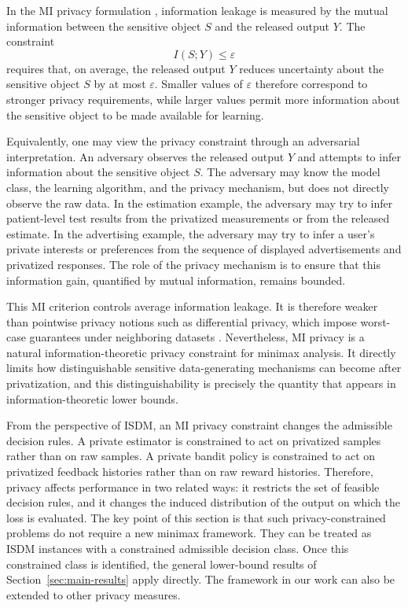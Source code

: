 \documentclass[journal]{IEEEtran}
\begin{document}
In the MI privacy formulation \cite{lopuhaa2020privacy,zamani2023privacy,zamani2022bounds,rassouli2021perfect,asoodeh2016information, basciftci2016privacy, shkel2020secrecy,du2017principal,zamani2024information,zamani2025variable,sankar2013utility, makhdoumi2014information}, information leakage is measured by the mutual
information between the sensitive object \(S\) and the released output \(Y\).
The constraint
\[
I(S;Y)\le \varepsilon
\]
requires that, on average, the released output \(Y\) reduces uncertainty about
the sensitive object \(S\) by at most \(\varepsilon\). Smaller values of
\(\varepsilon\) therefore correspond to stronger privacy requirements, while
larger values permit more information about the sensitive object to be made
available for learning.

Equivalently, one may view the privacy constraint through an adversarial
interpretation. An adversary observes the released output \(Y\) and attempts to
infer information about the sensitive object \(S\). The adversary may know the
model class, the learning algorithm, and the privacy mechanism, but does not
directly observe the raw data. In the estimation example, the adversary may try
to infer patient-level test results from the privatized measurements or from
the released estimate. In the advertising example, the adversary may try to
infer a user's private interests or preferences from the sequence of displayed
advertisements and privatized responses. The role of the privacy mechanism is
to ensure that this information gain, quantified by mutual information, remains
bounded.

This MI criterion controls average information leakage. It is therefore weaker
than pointwise privacy notions such as differential privacy, which impose
worst-case guarantees under neighboring datasets \cite{lopuhaa2020privacy}. Nevertheless, MI privacy is a
natural information-theoretic privacy constraint for minimax analysis. It
directly limits how distinguishable sensitive data-generating mechanisms can
become after privatization, and this distinguishability is precisely the
quantity that appears in information-theoretic lower bounds. 

From the perspective of ISDM, an MI privacy constraint changes the admissible
decision rules. A private estimator is constrained to act on privatized samples
rather than on raw samples. A private bandit policy is constrained to act on
privatized feedback histories rather than on raw reward histories. Therefore,
privacy affects performance in two related ways: it restricts the set of
feasible decision rules, and it changes the induced distribution of the output
on which the loss is evaluated. The key point of this section is that such
privacy-constrained problems do not require a new minimax framework. They can be
treated as ISDM instances with a constrained admissible decision class. Once this
constrained class is identified, the general lower-bound results of
Section~\ref{sec:main-results} apply directly. The framework in our work can also be extended to other privacy measures.
\end{document}
